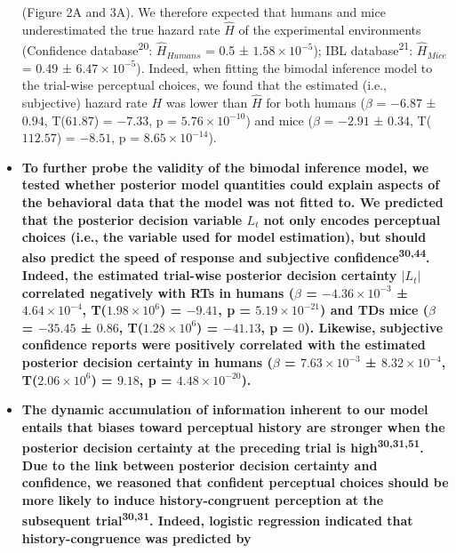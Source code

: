 \documentclass[
]{article}
\begin{document}
\begin{itemize}
{  (Figure 2A and 3A). We therefore expected that humans and mice
  underestimated the true hazard rate \(\hat{H}\) of the experimental
  environments (Confidence database\textsuperscript{20}:
  \(\hat{H}_{Humans}\) = 0.5 ± \ensuremath{1.58\times 10^{-5}}); IBL
  database\textsuperscript{21}: \(\hat{H}_{Mice}\) = 0.49 ±
  \ensuremath{6.47\times 10^{-5}}). Indeed, when fitting the bimodal
  inference model to the trial-wise perceptual choices, we found that
  the estimated (i.e., subjective) hazard rate \(H\) was lower than
  \(\hat{H}\) for both humans (\(\beta\) = \(-6.87\) ± \(0.94\),
  T(\(61.87\)) = \(-7.33\), p = \(\ensuremath{5.76\times 10^{-10}}\))
  and mice (\(\beta\) = \(-2.91\) ± \(0.34\), T(\(112.57\)) = \(-8.51\),
  p = \(\ensuremath{8.65\times 10^{-14}}\)).}
\item
  \textbf{To further probe the validity of the bimodal inference model,
  we tested whether posterior model quantities could explain aspects of
  the behavioral data that the model was not fitted to. We predicted
  that the posterior decision variable \(L_t\) not only encodes
  perceptual choices (i.e., the variable used for model estimation), but
  should also predict the speed of response and subjective
  confidence\textsuperscript{30,44}. Indeed, the estimated trial-wise
  posterior decision certainty \(|L_t|\) correlated negatively with RTs
  in humans (\(\beta\) = \(\ensuremath{-4.36\times 10^{-3}}\) ±
  \(\ensuremath{4.64\times 10^{-4}}\),
  T(\(\ensuremath{1.98\times 10^{6}}\)) = \(-9.41\), p =
  \(\ensuremath{5.19\times 10^{-21}}\)) and TDs mice (\(\beta\) =
  \(-35.45\) ± \(0.86\), T(\(\ensuremath{1.28\times 10^{6}}\)) =
  \(-41.13\), p = \(0\)). Likewise, subjective confidence reports were
  positively correlated with the estimated posterior decision certainty
  in humans (\(\beta\) = \(\ensuremath{7.63\times 10^{-3}}\) ±
  \(\ensuremath{8.32\times 10^{-4}}\),
  T(\(\ensuremath{2.06\times 10^{6}}\)) = \(9.18\), p =
  \(\ensuremath{4.48\times 10^{-20}}\)).}
\item
  \textbf{The dynamic accumulation of information inherent to our model
  entails that biases toward perceptual history are stronger when the
  posterior decision certainty at the preceding trial is
  high\textsuperscript{30,31,51}. Due to the link between posterior
  decision certainty and confidence, we reasoned that confident
  perceptual choices should be more likely to induce history-congruent
  perception at the subsequent trial\textsuperscript{30,31}. Indeed,
  logistic regression indicated that history-congruence was predicted by
}
\end{itemize}
\end{document}
